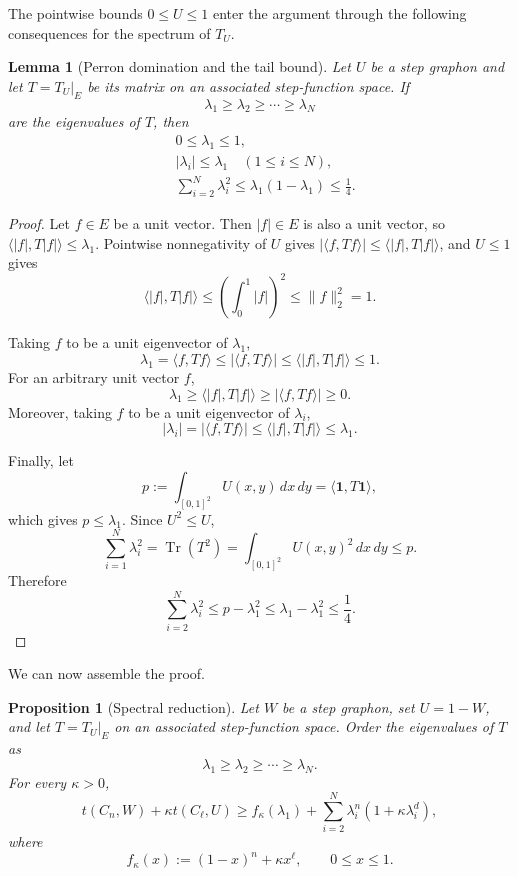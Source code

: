 \documentclass[11pt]{article}
\newtheorem{proposition}[theorem]{Proposition}
\newtheorem{lemma}[theorem]{Lemma}
\theoremstyle{definition}
\theoremstyle{remark}
\newcommand{\one}{\mathbf{1}}
\newcommand{\tr}{\operatorname{Tr}}
\begin{document}
The pointwise bounds $0\le U\le1$ enter the argument through the following
consequences for the spectrum of $T_U$.

\begin{lemma}[Perron domination and the tail bound]
  Let $U$ be a step graphon and let $T=T_U|_E$ be its matrix on an
  associated step-function space.  If
  \[
    \lambda_1\ge\lambda_2\ge\cdots\ge\lambda_N
  \]
  are the eigenvalues of $T$, then
  \begin{align}
    &0\le\lambda_1\le1,
    \label{eq:lambda-one-range}\\
    &|\lambda_i|\le\lambda_1
    \quad(1\le i\le N),
    \label{eq:perron-domination}\\
    &\sum_{i=2}^N\lambda_i^2
    \le\lambda_1(1-\lambda_1)
    \le\frac14.
    \label{eq:tail-bound}
  \end{align}
\end{lemma}

\begin{proof}
  Let $f\in E$ be a unit vector.  Then $|f|\in E$ is also a unit vector, so
  $\langle|f|,T|f|\rangle\le\lambda_1$.  Pointwise nonnegativity of $U$
  gives $|\langle f,Tf\rangle|\le\langle|f|,T|f|\rangle$, and $U\le1$ gives
  \[
    \langle|f|,T|f|\rangle
    \le\left(\int_0^1|f|\right)^2
    \le\|f\|_2^2=1 .
  \]

  Taking $f$ to be a unit eigenvector of $\lambda_1$,
  \[
    \lambda_1=\langle f,Tf\rangle
    \le|\langle f,Tf\rangle|
    \le\langle|f|,T|f|\rangle
    \le1 .
  \]
  For an arbitrary unit vector $f$,
  \[
    \lambda_1\ge\langle|f|,T|f|\rangle\ge|\langle f,Tf\rangle|\ge0 .
  \]
  Moreover, taking $f$ to be a unit eigenvector of $\lambda_i$,
  \[
    |\lambda_i|=|\langle f,Tf\rangle|\le\langle|f|,T|f|\rangle\le\lambda_1 .
  \]

  Finally, let
  \[
    p:=\int_{[0,1]^2}U(x,y)\,dx\,dy
    =\langle\one,T\one\rangle ,
  \]
  which gives $p\le\lambda_1$.  Since $U^2\le U$,
  \[
    \sum_{i=1}^N\lambda_i^2
    =\tr(T^2)
    =\int_{[0,1]^2}U(x,y)^2\,dx\,dy
    \le p.
  \]
  Therefore
  \[
    \sum_{i=2}^N\lambda_i^2
    \le p-\lambda_1^2
    \le\lambda_1-\lambda_1^2
    \le\frac14.
  \]
\end{proof}

We can now assemble the proof.

\begin{proposition}[Spectral reduction]
  \label{prop:spectral-reduction}
  Let $W$ be a step graphon, set $U=1-W$, and let
  $T=T_U|_E$ on an associated step-function space.  Order the eigenvalues of
  $T$ as
  \[
    \lambda_1\ge\lambda_2\ge\cdots\ge\lambda_N.
  \]
  For every $\kappa>0$,
  \begin{equation}
    t(C_n,W)+\kappa t(C_\ell,U)
    \ge
    f_\kappa(\lambda_1)
    +\sum_{i=2}^N
      \lambda_i^n(1+\kappa\lambda_i^d),
    \label{eq:master-spectral}
  \end{equation}
  where
  \[
    f_\kappa(x):=(1-x)^n+\kappa x^\ell,
    \qquad 0\le x\le1.
  \]
\end{proposition}
\end{document}
